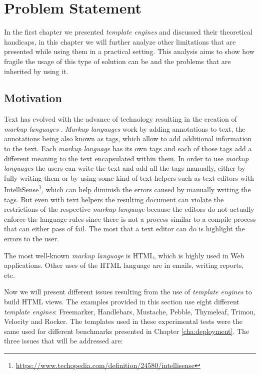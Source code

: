 \chapter{Problem Statement}
\label{cha:problem}

\sloppy

In the first chapter we presented \textit{template engines} and discussed their theoretical handicaps, in this chapter we will further analyze other limitations that are presented while using them in a practical setting. This analysis aims to show how fragile the usage of this type of solution can be and the problems that are inherited by using it.

\section{Motivation}
\label{sec:motivation}

Text has evolved with the advance of technology resulting in the creation of \textit{markup languages} \cite{ml}. \textit{Markup languages} work by adding annotations to text, the annotations being also known as tags, which allow to add additional information to the text. Each \textit{markup language} has its own tags and each of those tags add a different meaning to the text encapsulated within them. In order to use \textit{markup languages} the users can write the text and add all the tags manually, either by fully writing them or by using some kind of text helpers such as text editors with IntelliSense\footnote{\url{https://www.techopedia.com/definition/24580/intellisense}}, which can help diminish the errors caused by manually writing the tags. But even with text helpers the resulting document can violate the restrictions of the respective \textit{markup language} because the editors do not actually enforce the language rules since there is not a process similar to a compile process that can either pass of fail. The most that a text editor can do is highlight the errors to the user.

\noindent
The most well-known \textit{markup language} is \ac{HTML}, which is highly used in Web applications. Other uses of the \ac{HTML} language are in emails, writing reports, etc.

\noindent
Now we will present different issues resulting from the use of \textit{template engines} to build \ac{HTML} views. The examples provided in this section use eight different \textit{template engines}: Freemarker\cite{freemarker}, Handlebars\cite{handlebars}, Mustache\cite{mustache}, Pebble\cite{pebble}, Thymeleaf\cite{thymeleaf}, Trimou\cite{trimou}, Velocity\cite{velocity} and Rocker\cite{rocker}. The templates used in these experimental tests were the same used for different benchmarks presented in Chapter \ref{cha:deployment}. The three issues that will be addressed are:

